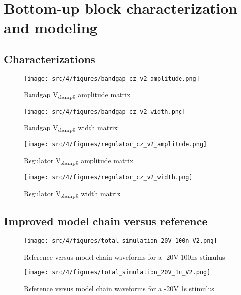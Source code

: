 \chapter{Bottom-up block characterization and modeling}
\section{Characterizations}
\label{apx:block-cz}

\begin{figure}[!h]
  \centering
  \texttt{[image: src/4/figures/bandgap\_cz\_v2\_amplitude.png]}
  \caption{Bandgap V\textsubscript{clamp9} amplitude matrix}
  \label{fig:bg_amp}
\end{figure}

\begin{figure}[!h]
  \centering
  \texttt{[image: src/4/figures/bandgap\_cz\_v2\_width.png]}
  \caption{Bandgap V\textsubscript{clamp9} width matrix}
  \label{fig:bg_width}
\end{figure}

\begin{figure}[!h]
  \centering
  \texttt{[image: src/4/figures/regulator\_cz\_v2\_amplitude.png]}
  \caption{Regulator V\textsubscript{clamp9} amplitude matrix}
  \label{fig:regu_amp}
\end{figure}

\begin{figure}[!h]
  \centering
  \texttt{[image: src/4/figures/regulator\_cz\_v2\_width.png]}
  \caption{Regulator V\textsubscript{clamp9} width matrix}
  \label{fig:regu_width}
\end{figure}

\section{Improved model chain versus reference}
\label{apx:block-model-comparison}

\begin{figure}[!h]
  \centering
  \texttt{[image: src/4/figures/total\_simulation\_20V\_100n\_V2.png]}
  \caption{Reference versus model chain waveforms for a -20V 100ns stimulus}
  \label{fig:reference_simu_v2_20V_100n}
\end{figure}


\begin{figure}[!h]
  \centering
  \texttt{[image: src/4/figures/total\_simulation\_20V\_1u\_V2.png]}
  \caption{Reference versus model chain waveforms for a -20V 1\textmu{}s stimulus}
  \label{fig:reference_simu_v2_20V_100n}
\end{figure}
